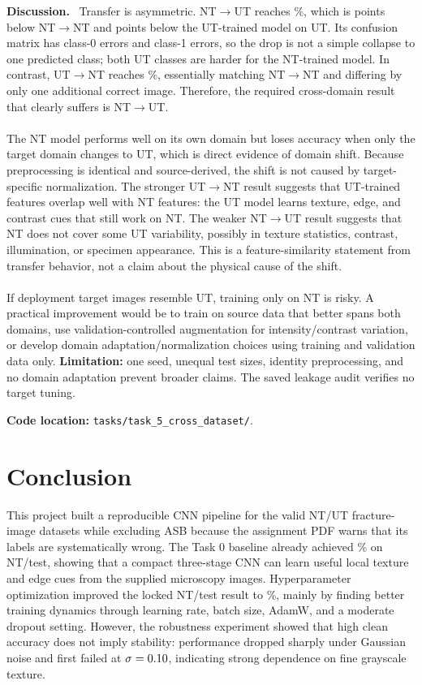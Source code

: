 \documentclass[10pt,a4paper]{article}
\newcommand{\TaskEnd}[1]{\label{task:#1:end}}
\newcommand{\RunHead}[1]{\par\smallskip\noindent\textbf{#1.}\ }
\newcommand{\CodePath}[1]{%
  \par\smallskip\noindent\textbf{Code location: }\nolinkurl{#1}.%
}
\begin{document}
\RunHead{Discussion}
Transfer is asymmetric. NT$\rightarrow$UT reaches
\TaskFiveNTUT\%, which is \TaskFiveNTUTSourceDrop{} points below NT$\rightarrow$NT and
\TaskFiveNTUTTargetGap{} points below the UT-trained model on UT. Its confusion matrix has
\TaskFiveNTUTClassZeroErrors{} class-0 errors and \TaskFiveNTUTClassOneErrors{} class-1 errors,
so the drop is not a simple collapse to one predicted class; both UT classes are harder for the
NT-trained model. In contrast, UT$\rightarrow$NT reaches \TaskFiveUTNT\%, essentially matching
NT$\rightarrow$NT and differing by only one additional correct image. Therefore, the required
cross-domain result that clearly suffers is NT$\rightarrow$UT.
\\ \\
The NT model performs well on its own domain but
loses accuracy when only the target domain changes to UT, which is direct evidence of domain
shift. Because preprocessing is identical and source-derived, the shift is not caused by
target-specific normalization. The stronger UT$\rightarrow$NT result suggests that UT-trained
features overlap well with NT features: the UT model learns texture, edge, and contrast cues
that still work on NT. The weaker NT$\rightarrow$UT result suggests that NT does not cover some
UT variability, possibly in texture statistics, contrast, illumination, or specimen appearance.
This is a feature-similarity statement from transfer behavior, not a claim about the physical
cause of the shift.
\\ \\
If deployment target images resemble UT, training only on NT is risky.
A practical improvement would be to train on source data that better spans both domains, use
validation-controlled augmentation for intensity/contrast variation, or develop domain
adaptation/normalization choices using training and validation data only. \textbf{Limitation:}
one seed, unequal test sizes, identity preprocessing, and no domain adaptation prevent broader
claims. The saved leakage audit verifies no target tuning.

\CodePath{tasks/task_5_cross_dataset/}
\TaskEnd{5}

\clearpage

\section*{Conclusion}
This project built a reproducible CNN pipeline for the valid NT/UT fracture-image datasets
while excluding ASB because the assignment PDF warns that its labels are systematically wrong.
The Task 0 baseline already achieved \TaskZeroAccuracy\% on NT/test, showing that a compact
three-stage CNN can learn useful local texture and edge cues from the supplied microscopy
images. Hyperparameter optimization improved the locked NT/test result to \TaskOneTestAccuracy\%,
mainly by finding better training dynamics through learning rate, batch size, AdamW, and a
moderate dropout setting. However, the robustness experiment showed that high clean accuracy
does not imply stability: performance dropped sharply under Gaussian noise and first failed at
$\sigma=0.10$, indicating strong dependence on fine grayscale texture.
\end{document}
